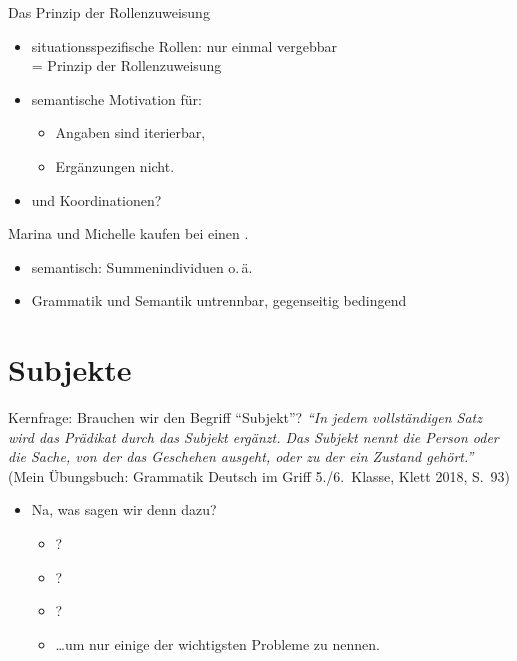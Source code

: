 \begin{frame}
  {Das Prinzip der Rollenzuweisung}
  \pause
  \begin{itemize}[<+->]
    \item situationsspezifische Rollen: \alert{nur einmal vergebbar}\\
    = Prinzip der Rollenzuweisung
      \Halbzeile
    \item semantische Motivation für:
      \begin{itemize}[<+->]
        \item Angaben sind iterierbar,
        \item Ergänzungen nicht.
      \end{itemize}
      \Halbzeile
    \item und \alert{Koordinationen}?
  \end{itemize}
  \pause
  \begin{exe}
    \ex \alert{Marina und Michelle} kaufen bei  einen .
  \end{exe}
  \pause
  \begin{itemize}[<+->]
    \item semantisch: Summenindividuen o.\,ä.
    \item \alert{Grammatik und Semantik untrennbar, gegenseitig bedingend}
  \end{itemize}
\end{frame}

\section{Subjekte}

\begin{frame}
  {Kernfrage: Brauchen wir den Begriff "`Subjekt"'?}
  \pause
  \textit{"`In jedem vollständigen Satz wird das Prädikat durch das Subjekt ergänzt. Das Subjekt nennt die Person oder die Sache, von der das Geschehen ausgeht, oder zu der ein Zustand gehört."'}\\
  \pause\Viertelzeile
  {\small (Mein Übungsbuch: Grammatik Deutsch im Griff 5.\slash 6.~Klasse, Klett 2018, S.~93)}
  \pause
  \Halbzeile
  \begin{itemize}[<+->]
    \item Na, was sagen wir denn dazu?
      \begin{itemize}[<+->]
        \item {}?
        \item {}?
        \item {}?
        \item \ldots um nur einige der wichtigsten Probleme zu nennen.
      \end{itemize}
  \end{itemize}
\end{frame}

